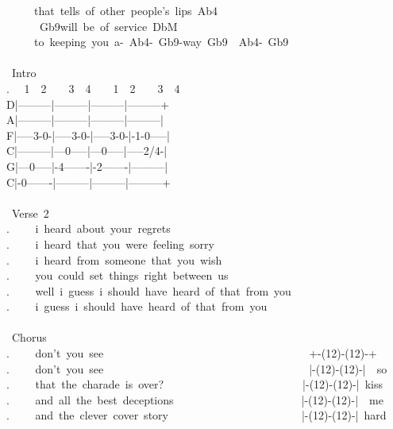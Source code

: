 {\ \ \ \ \ that\ tells\ of\ other\ people's\ lips\lbrack\ Ab4\rbrack\\
\ \ \ \ \ \lbrack\ Gb9\rbrack will\ be\ of\ service\lbrack\ DbM\rbrack\\
\ \ \ \ \ to\ keeping\ you\ a-\lbrack\ Ab4\rbrack-\lbrack\ Gb9\rbrack-way\lbrack\ Gb9\rbrack\ \lbrack\ Ab4\rbrack-\lbrack\ Gb9\rbrack\\\
\\
\lbrack\ Intro\rbrack\\
. \ \ 1\ \ 2\ \ \ \ 3\ \ 4\ \ \ \ 1\ \ 2\ \ \ \ 3\ \ 4\ \\
D|---------|---------|---------|---------+\\
A|---------|---------|---------|---------|\\
F|-----3-0-|-----3-0-|-----3-0-|-1-0-----|\\
C|---------|---0-----|---0-----|-----2/4-|\\
G|---0-----|-4-------|-2-------|---------|\\
C|-0-------|---------|---------|---------+\\
\\
\lbrack\ Verse\ 2\rbrack\\
. \ \ \ \ i\ heard\ about\ your\ regrets\\
. \ \ \ \ i\ heard\ that\ you\ were\ feeling\ sorry\\
. \ \ \ \ i\ heard\ from\ someone\ that\ you\ wish\\
. \ \ \ \ you\ could\ set\ things\ right\ between\ us\\
. \ \ \ \ well\ i\ guess\ i\ should\ have\ heard\ of\ that\ from\ you\\
. \ \ \ \ i\ guess\ i\ should\ have\ heard\ of\ that\ from\ you\\\
\\
\lbrack\ Chorus\rbrack\\
. \ \ \ \ don't\ you\ see\ \ \ \ \ \ \ \ \ \ \ \ \ \ \ \ \ \ \ \ \ \ \ \ \ \ \ \ \ \ \ \ \ \ \ \ \ +-(12)-(12)-+\\
. \ \ \ \ don't\ you\ see\ \ \ \ \ \ \ \ \ \ \ \ \ \ \ \ \ \ \ \ \ \ \ \ \ \ \ \ \ \ \ \ \ \ \ \ \ |-(12)-(12)-|\ \ so\\
. \ \ \ \ that\ the\ charade\ is\ over?\ \ \ \ \ \ \ \ \ \ \ \ \ \ \ \ \ \ \ \ \ \ \ \ \ |-(12)-(12)-|\ kiss\\
. \ \ \ \ and\ all\ the\ best\ deceptions\ \ \ \ \ \ \ \ \ \ \ \ \ \ \ \ \ \ \ \ \ \ \ |-(12)-(12)-|\ \ me\\
. \ \ \ \ and\ the\ clever\ cover\ story\ \ \ \ \ \ \ \ \ \ \ \ \ \ \ \ \ \ \ \ \ \ \ \ |-(12)-(12)-|\ hard\\\
}
